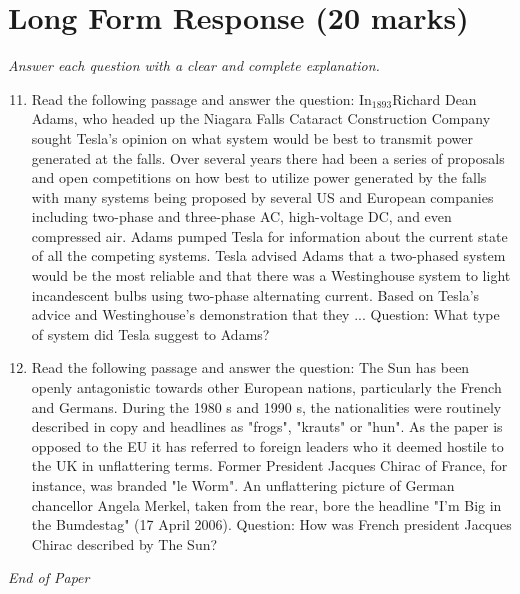 \documentclass[12pt]{article}
\begin{document}
\section*{Long Form Response (20 marks)}
\textit{Answer each question with a clear and complete explanation.}
\begin{enumerate}[label=\arabic*.]
\setcounter{enumi}{10}
\item Read the following passage and answer the question: In$_{1893}$Richard Dean Adams, who headed up the Niagara Falls Cataract Construction Company sought Tesla's opinion on what system would be best to transmit power generated at the falls. Over several years there had been a series of proposals and open competitions on how best to utilize power generated by the falls with many systems being proposed by several US and European companies including two-phase and three-phase AC, high-voltage DC, and even compressed air. Adams pumped Tesla for information about the current state of all the competing systems. Tesla advised Adams that a two-phased system would be the most reliable and that there was a Westinghouse system to light incandescent bulbs using two-phase alternating current. Based on Tesla's advice and Westinghouse's demonstration that they ... Question: What type of system did Tesla suggest to Adams?
\item Read the following passage and answer the question: The Sun has been openly antagonistic towards other European nations, particularly the French and Germans. During the 1980 s and 1990 s, the nationalities were routinely described in copy and headlines as "frogs", "krauts" or "hun". As the paper is opposed to the EU it has referred to foreign leaders who it deemed hostile to the UK in unflattering terms. Former President Jacques Chirac of France, for instance, was branded "le Worm". An unflattering picture of German chancellor Angela Merkel, taken from the rear, bore the headline "I'm Big in the Bumdestag" (17 April 2006). Question: How was French president Jacques Chirac described by The Sun?
\end{enumerate}

\vfill
\noindent\textit{End of Paper}
\end{document}
